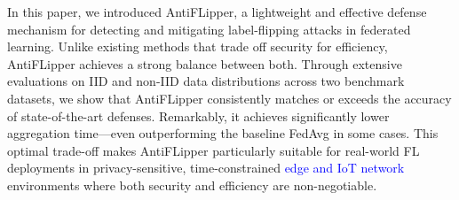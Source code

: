 \documentclass[conference]{IEEEtran}
\begin{document}
In this paper, we introduced AntiFLipper, a lightweight and effective defense mechanism for detecting and mitigating label-flipping attacks in federated learning. Unlike existing methods that trade off security for efficiency, AntiFLipper achieves a strong balance between both. Through extensive evaluations on IID and non-IID data distributions across two benchmark datasets, we show that AntiFLipper consistently matches or exceeds the accuracy of state-of-the-art defenses. Remarkably, it achieves significantly lower aggregation time—even outperforming the baseline FedAvg in some cases. This optimal trade-off makes AntiFLipper particularly suitable for real-world FL deployments in privacy-sensitive, time-constrained \textcolor{blue}{edge and IoT network} environments where both security and efficiency are non-negotiable.




\end{document}
